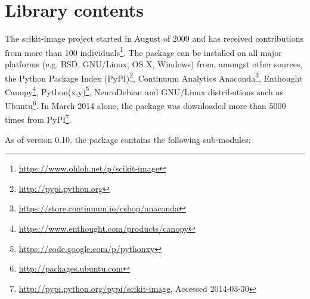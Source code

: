 
\section*{Library contents}
  \label{library-contents}

  The scikit-image project started in August of 2009 and has received contributions from more than 100 individuals\footnote{\url{https://www.ohloh.net/p/scikit-image}}.  The package can be installed on all major platforms (e.g. BSD, GNU/Linux, OS X, Windows) from, amongst other sources, the Python Package Index (PyPI)\footnote{\url{http://pypi.python.org}}, Continuum Analytics Anaconda\footnote{\url{https://store.continuum.io/cshop/anaconda}}, Enthought Canopy\footnote{\url{https://www.enthought.com/products/canopy}}, Python(x,y)\footnote{\url{https://code.google.com/p/pythonxy}}, NeuroDebian \citep{neurodebian} and GNU/Linux distributions such as Ubuntu\footnote{\url{http://packages.ubuntu.com}}. In March 2014 alone, the package was downloaded more than 5000 times from PyPI\footnote{\url{http://pypi.python.org/pypi/scikit-image}, Accessed 2014-03-30}.

  As of version 0.10, the package contains the following sub-modules:

